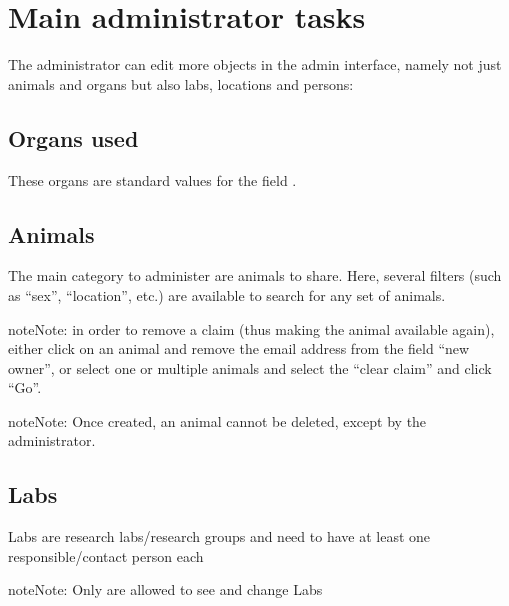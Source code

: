 \documentclass[letterpaper,10pt,openany,oneside,english]{sphinxmanual}
\begin{document}
\chapter{Main administrator tasks}
\label{\detokenize{index:main-administrator-tasks}}
The administrator can edit more objects in the admin interface, namely not just animals and organs
but also labs, locations and persons:

\noindent{}


\section{Organs used}
\label{\detokenize{index:organs-used}}
These organs are standard values for the field .


\section{Animals}
\label{\detokenize{index:id3}}
The main category to administer are animals to share.
Here, several filters (such as “sex”, “location”, etc.) are available to search for any set of animals.

\noindent{}

\begin{sphinxadmonition}{note}{Note:}
in order to remove a claim (thus making the animal available again), either click on an animal
and remove the email address from the field “new owner”, or select one or multiple animals and
select the “clear claim”  and click “Go”.
\end{sphinxadmonition}

\begin{sphinxadmonition}{note}{Note:}
Once created, an animal cannot be deleted, except by the administrator.
\end{sphinxadmonition}


\section{Labs}
\label{\detokenize{index:labs}}
Labs are research labs/research groups and need to have at least one responsible/contact person each

\noindent{}

\begin{sphinxadmonition}{note}{Note:}
Only  are allowed to see and change Labs
\end{sphinxadmonition}
\end{document}
